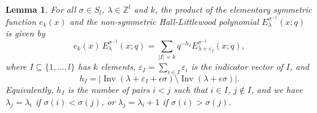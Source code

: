 \documentclass[12pt]{amsart}
\newtheorem{lemma}[thm]{Lemma}
\theoremstyle{definition}
\theoremstyle{remark}
\newcommand{\ZZ}{{\mathbb Z}}
\DeclareMathOperator{\Inv}{Inv}
\begin{document}
\begin{lemma}\label{lem:ek-on-E-lambda}
For all $\sigma \in S_{l}$, $\lambda \in \ZZ ^{l}$ and $k$,
the product of the elementary symmetric function $e_{k}(x)$ and the
non-symmetric Hall-Littlewood polynomial $E^{\sigma^{-1} }_{\lambda
}(x;q)$ is given by
\begin{equation}\label{e:ek-on-E-lambda}
e_{k}(x)\, E^{\sigma ^{-1}}_{\lambda }(x;q) = \sum _{|I| = k}
q^{-h_{I}} E^{\sigma ^{-1}}_{\lambda + \varepsilon _{I}}(x;q),
\end{equation}
where $I\subseteq \{1,\ldots,l \}$ has $k$ elements, $\varepsilon _{I}
= \sum _{i\in I}\varepsilon _{i}$ is the indicator vector of $I$, and
\begin{equation}\label{e:hI}
h_{I} = |\Inv (\lambda + \varepsilon _{I} + \epsilon \sigma )\setminus
\Inv (\lambda + \epsilon \sigma )|.
\end{equation}
Equivalently, $h_{I}$ is the number of pairs $i<j$ such that $i\in I$,
$j\not \in I$, and we have $\lambda _{j} = \lambda _{i}$ if $\sigma
(i)<\sigma (j)$, or $\lambda _{j} = \lambda _{i}+1$ if $\sigma
(i)>\sigma (j)$.
\end{lemma}
\end{document}
